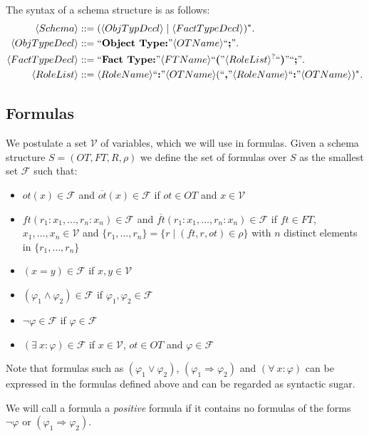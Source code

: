\documentclass[11pt]{amsart}
\newcommand{\nt}[1]{\langle {#1} \rangle}
\newcommand{\tm}[1]{\textrm{``\textbf{#1}''}}
\begin{document}
The syntax of a schema structure is as follows:
{\small
\begin{align*}
\nt{Schema} &::= ( \nt{ObjTypDecl} \mid \nt{FactTypeDecl} )^* . \\
\nt{ObjTypeDecl} &::= \tm{Object Type:} \nt{OTName} \tm{;}. \\
\nt{FactTypeDecl} &::= \tm{Fact Type:} \nt{FTName} \tm{(} \nt{RoleList}^? \tm{)} \tm{;}. \\
\nt{RoleList} &::= \nt{RoleName} \tm{:} \nt{OTName} (\tm{,} \nt{RoleName} \tm{:} \nt{OTName} )^* .
\end{align*}  
}


  
\subsection{Formulas} 

We postulate a set $\mathcal{V}$ of variables, which we will use in formulas. Given a schema structure $S = (OT, FT, R, \rho)$ we define the set of formulas over $S$ as the smallest set $\mathcal{F}$  such that:
\begin{itemize}
  \item $ot(x) \in \mathcal{F}$ and $\overline{ot}(x) \in \mathcal{F}$ if $ot \in OT$ and $x \in \mathcal{V}$
  \item $ft(r_1:x_1, \ldots, r_n:x_n) \in \mathcal{F}$ and $\overline{ft}(r_1:x_1, \ldots, r_n:x_n) \in \mathcal{F}$ if $ft \in FT$, $x_1, \ldots, x_n \in \mathcal{V}$ and $\{ r_1, \ldots, r_n \} = \{ r \mid (ft, r, ot) \in \rho \}$ with $n$ distinct elements in $\{ r_1, \ldots, r_n \}$  
  \item $(x = y) \in \mathcal{F}$ if $x, y \in \mathcal{V}$ 
  \item $(\varphi_1 \wedge \varphi_2) \in \mathcal{F}$ if $\varphi_1, \varphi_2 \in \mathcal{F}$
  \item $\neg\varphi \in \mathcal{F}$ if $\varphi \in \mathcal{F}$
  \item $(\exists\  x : \varphi) \in \mathcal{F}$ if $x \in \mathcal{V}$, $ot \in OT$ and $\varphi \in \mathcal{F}$
\end{itemize}
Note that formulas such as $(\varphi_1 \vee \varphi_2)$, $(\varphi_1 \Rightarrow \varphi_2)$ and $(\forall\  x : \varphi)$ can be expressed in the formulas defined above and can be regarded as syntactic sugar.

We will call a formula a \emph{positive} formula if it contains no formulas of the forms $\neg\varphi$ or $(\varphi_1 \Rightarrow \varphi_2)$.
\end{document}
